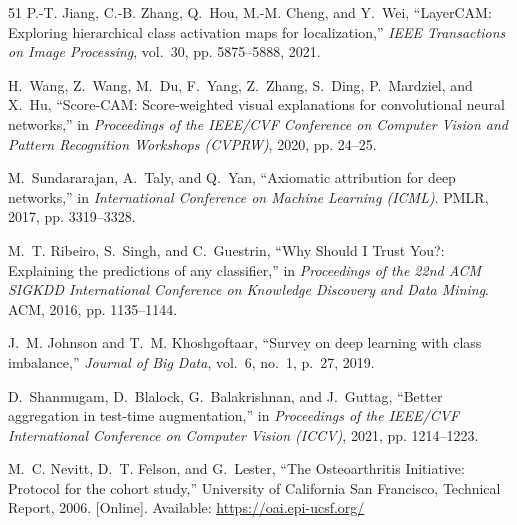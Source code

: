 \documentclass[10pt,journal]{IEEEtran}
\begin{document}
\begin{thebibliography}{51}
P.-T. Jiang, C.-B. Zhang, Q.~Hou, M.-M. Cheng, and Y.~Wei, ``LayerCAM: Exploring hierarchical class activation maps for localization,'' \emph{IEEE Transactions on Image Processing}, vol.~30, pp. 5875--5888, 2021.

H.~Wang, Z.~Wang, M.~Du, F.~Yang, Z.~Zhang, S.~Ding, P.~Mardziel, and X.~Hu, ``Score-CAM: Score-weighted visual explanations for convolutional neural networks,'' in \emph{Proceedings of the IEEE/CVF Conference on Computer Vision and Pattern Recognition Workshops (CVPRW)}, 2020, pp. 24--25.

M.~Sundararajan, A.~Taly, and Q.~Yan, ``Axiomatic attribution for deep networks,'' in \emph{International Conference on Machine Learning (ICML)}. PMLR, 2017, pp. 3319--3328.

M.~T. Ribeiro, S.~Singh, and C.~Guestrin, ``Why Should I Trust You?: Explaining the predictions of any classifier,'' in \emph{Proceedings of the 22nd ACM SIGKDD International Conference on Knowledge Discovery and Data Mining}. ACM, 2016, pp. 1135--1144.

J.~M. Johnson and T.~M. Khoshgoftaar, ``Survey on deep learning with class imbalance,'' \emph{Journal of Big Data}, vol.~6, no.~1, p.~27, 2019.

D.~Shanmugam, D.~Blalock, G.~Balakrishnan, and J.~Guttag, ``Better aggregation in test-time augmentation,'' in \emph{Proceedings of the IEEE/CVF International Conference on Computer Vision (ICCV)}, 2021, pp. 1214--1223.

M.~C. Nevitt, D.~T. Felson, and G.~Lester, ``The Osteoarthritis Initiative: Protocol for the cohort study,'' University of California San Francisco, Technical Report, 2006. [Online]. Available: \url{https://oai.epi-ucsf.org/}
\end{thebibliography}
\end{document}
